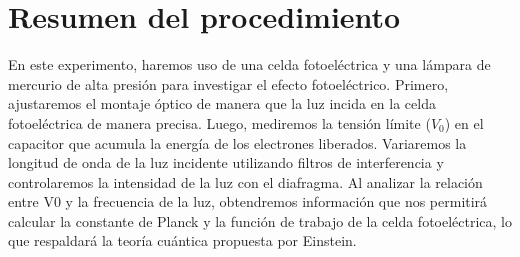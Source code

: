 \documentclass[twocolumn, 12pt]{article}
\begin{document}
\section{Resumen del procedimiento}

En este experimento, haremos uso de una celda fotoeléctrica
y una lámpara de mercurio de alta presión para investigar
el efecto fotoeléctrico. Primero, ajustaremos el montaje
óptico de manera que la luz incida en la celda
fotoeléctrica de manera precisa. Luego, mediremos la
tensión límite ($V_0$) en el capacitor que acumula la
energía de los electrones liberados. Variaremos la longitud
de onda de la luz incidente utilizando filtros de
interferencia y controlaremos la intensidad de la luz con
el diafragma. Al analizar la relación entre V0 y la
frecuencia de la luz, obtendremos información que nos
permitirá calcular la constante de Planck y la función de
trabajo de la celda fotoeléctrica, lo que respaldará la
teoría cuántica propuesta por Einstein.

\printbibliography
\end{document}
